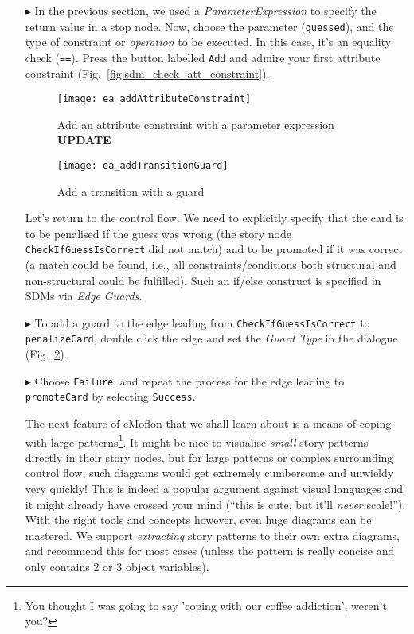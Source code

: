 \begin{itemize}
\item[$\blacktriangleright$] In the previous section, we used a \emph{ParameterExpression} to specify the return value in a stop node. Now, choose the parameter
(\texttt{guessed}), and the type of constraint or \emph{operation} to be executed. In this case, it's an equality check (\texttt{==}). Press the button labelled
\texttt{Add} and admire your first attribute constraint (Fig.~\ref{fig:sdm_check_att_constraint}).

\begin{figure}[htbp]
\begin{center}
  \texttt{[image: ea\_addAttributeConstraint]}
  \caption{Add an attribute constraint with a parameter expression {\bf UPDATE}}
  \label{fig:sdm_check_att_constraint }
\end{center}
\end{figure}

\begin{figure}[htbp]
\begin{center}
  \texttt{[image: ea\_addTransitionGuard]}
  \caption{Add a transition with a guard}
  \label{fig:sdm_check_guard}
\end{center}
\end{figure}

Let's return to the control flow.  We need to explicitly specify that the card is to be penalised if the guess was wrong (the story node
\texttt{Check\-If\-Guess\-Is\-Correct} did not match) and to be promoted if it was correct (a match could be found, i.e., all constraints/conditions both
 structural and non-structural could be fulfilled). Such an if/else construct is specified in SDMs via \emph{Edge Guards}.

\item[$\blacktriangleright$] To add a guard to the edge leading from \texttt{Check\-If\-Guess\-Is\-Correct} to \texttt{penalize\-Card}, double click the edge
and set the \emph{Guard Type} in the dialogue (Fig.~\ref{fig:sdm_check_guard}).

\item[$\blacktriangleright$] Choose \texttt{Failure}, and repeat the process for the edge leading to \texttt{promoteCard} by selecting \texttt{Success}.

\pagebreak

The next feature of eMoflon that we shall learn about is a means of coping with large patterns\footnote{You thought I was going to say 'coping with our coffee
addiction', weren't you?}. It might be nice to visualise \emph{small} story patterns directly in their story nodes, but for large patterns or complex
surrounding control flow, such diagrams would get extremely cumbersome and unwieldy very quickly!  This is indeed a popular argument against visual languages and
it might already have crossed your mind (``this is cute, but it'll \emph{never} scale!''). With the right tools and concepts however, even huge diagrams can be
mastered. We support \emph{extracting} story patterns to their own extra diagrams, and recommend this for most cases (unless the
pattern is really concise and only contains 2 or 3 object variables).


\end{itemize}
